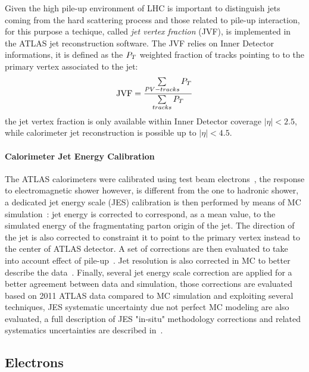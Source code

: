 Given the high pile-up environment of LHC  is important to distinguish jets coming from the hard scattering process and those
related to pile-up interaction, for this purpose a techique, called \emph{jet vertex fraction} (JVF), is implemented in the 
ATLAS jet reconstruction software.
The JVF relies on Inner Detector informations, it is defined as the $P_{T}$ weighted fraction of tracks pointing
to to the primary vertex associated to the jet:
\begin{equation}
\text{JVF} = \frac{\sum\limits_{PV-tracks}P_{T}}{\sum\limits_{tracks}P_{T}}
\end{equation} 
the jet vertex fraction  is only available within Inner Detector coverage $|\eta| < 2.5$,
while calorimeter jet reconstruction is possible up to $|\eta| < 4.5$.

\paragraph{Calorimeter Jet Energy Calibration}
The ATLAS calorimeters were calibrated using test beam electrons~\cite{EMcalibration},  the response
to electromagnetic shower however,  is different from the one to hadronic shower, a dedicated jet energy scale
(JES) calibration is then performed by means of MC simulation~\cite{jesinsitu}: 
jet energy is corrected to correspond, as a mean value, to the simulated energy 
of the fragmentating parton origin of the jet. The direction of the jet is also corrected to constraint it to point
to the primary vertex instead to the center of ATLAS detector. A set of corrections are then evaluated to take into account
effect of pile-up~\cite{jespileup, jesarea}. Jet resolution is also corrected in MC to better describe the data~\cite{jer}. 
Finally, several jet energy scale correction are applied for a better agreement between 
data and simulation, those corrections are evaluated based on 2011 ATLAS data compared to MC simulation and 
exploiting several techniques, JES systematic uncertainty due not perfect MC modeling are also evaluated,
a full description of JES "in-situ" methodology corrections and related systematics uncertainties are 
described in~\cite{jesinsitu, JES}.

\subsection{Electrons}
\label{sec:presel:elec}

